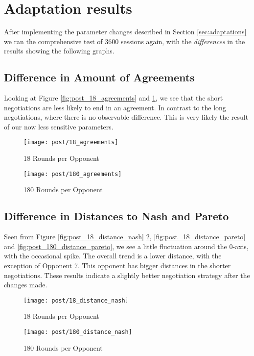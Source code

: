 \section{Adaptation results}

After implementing the parameter changes described in Section \ref{sec:adaptations} we ran the comprehensive test of 3600 sessions again, with the \emph{differences} in the results showing the following graphs.

\subsection{Difference in Amount of Agreements}

Looking at Figure \ref{fig:post_18_agreements} and \ref{fig:post_180_agreements}, we see that the short negotiations are less likely to end in an agreement. In contrast to the long negotiations, where there is no observable difference. This is very likely the result of our now less sensitive parameters.

\begin{figure}[H]
	\texttt{[image: post/18\_agreements]}
	\caption{18 Rounds per Opponent}
	\label{fig:post_18_agreements}
	\endminipage\hfill
	\texttt{[image: post/180\_agreements]}
	\caption{180 Rounds per Opponent}
	\label{fig:post_180_agreements}
	\endminipage\hfill
\end{figure}

\subsection{Difference in Distances to Nash and Pareto}

Seen from Figure \ref{fig:post_18_distance_nash} \ref{fig:post_180_distance_nash}, \ref{fig:post_18_distance_pareto} and \ref{fig:post_180_distance_pareto}, we see a little fluctuation around the 0-axis, with the occasional spike. The overall trend is a lower distance, with the exception of Opponent 7. This opponent has bigger distances in the shorter negotiations. These results indicate a slightly better negotiation strategy after the changes made.

\begin{figure}[H]
	\texttt{[image: post/18\_distance\_nash]}
	\caption{18 Rounds per Opponent}
	\label{fig:post_18_distance_nash}
	\endminipage\hfill
	\texttt{[image: post/180\_distance\_nash]}
	\caption{180 Rounds per Opponent}
	\label{fig:post_180_distance_nash}
	\endminipage\hfill
\end{figure}

